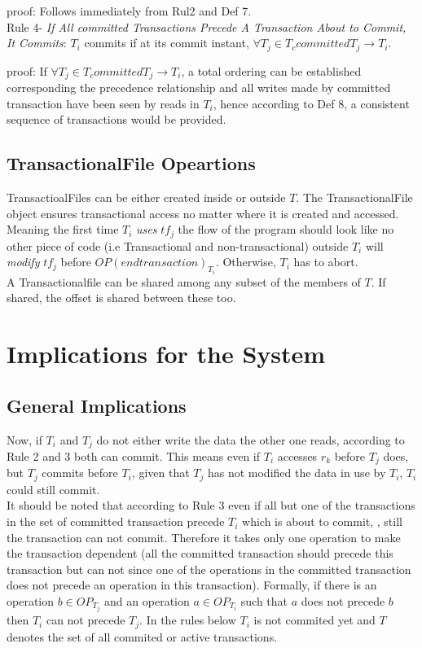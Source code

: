 \documentclass[a4paper, 11pt]{article}
\begin{document}
proof: Follows immediately from Rul2 and Def 7.\\

Rule 4- \emph{If All committed Transactions Precede A Transaction About to Commit, It Commits}: $T_i$ commits if at its commit instant, $\forall T_j \in T_ccommitted T_j \rightarrow T_i$.

proof: If $\forall T_j \in T_committed T_j \rightarrow T_i$, a total ordering can be established corresponding the precedence relationship and all writes made by committed transaction have been seen by reads in $T_i$, hence according to Def 8, a consistent sequence of transactions would be provided. 

\subsection{TransactionalFile Opeartions}
TransactioalFiles can be either created inside or outside $T$. The TransactionalFile object ensures transactional access no matter where it is created and accessed. Meaning the first time $T_i$ \emph {uses} $tf_j$ the flow of the program should look like no other piece of code (i.e Transactional and non-transactional) outside $T_i$ will \emph {modify} $tf_j$ before $OP(endtransaction)_{T_i}$. Otherwise, $T_i$ has to abort. \\


A Transactionalfile can be shared among any subset of the members of $T$. If shared, the offset is shared between these too. 

\section{Implications for the System}

\subsection{General Implications}
Now, if $T_i$ and $T_j$ do not either write the data the other one reads, according to Rule 2 and 3 both can commit. This means even if $T_i$ accesses $r_k$ before $T_j$ does, but $T_j$ commits before $T_i$, given that $T_j$ has not modified the data in use by $T_i$, $T_i$ could still commit. \\


It should be noted that according to Rule 3 even if all but one of the transactions in the set of committed transaction precede $T_i$ which is about to commit, , still the transaction can not commit. Therefore it takes only one operation to make the transaction dependent (all the committed transaction should precede this transaction but can not since one of the operations in the committed transaction does not precede an operation in this transaction). Formally, if there is an operation $b \in OP_{T_j}$ and an operation $a \in OP_{T_i}$ such that $a$ does not precede $b$ then $T_i$ can not precede $T_j$. In the rules below $T_i$ is not commited yet and $T$ denotes the set of all commited or active transactions. \\
\end{document}
